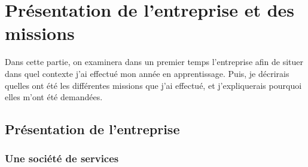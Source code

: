 \chapter{Présentation de l'entreprise et des missions}


Dans cette partie, on examinera dans un premier temps l'entreprise afin de situer dans quel contexte j'ai effectué mon année en apprentissage. Puis, je décrirais quelles ont été les différentes missions que j'ai effectué, et j'expliquerais pourquoi elles m'ont été demandées.

\section{Présentation de l'entreprise}
\subsection{Une société de services}
